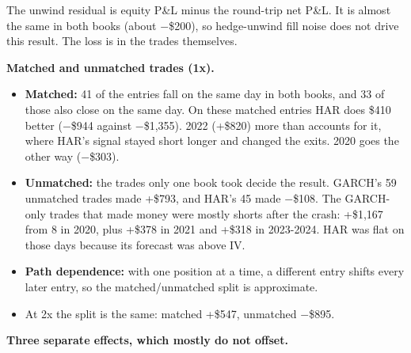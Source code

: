 \documentclass{article}
\begin{document}
The unwind residual is equity P\&L minus the round-trip net P\&L. It is almost the same in both books (about \ensuremath{-}\$200), so hedge-unwind fill noise does not drive this result. The loss is in the trades themselves.

\textbf{Matched and unmatched trades (1x).}

\begin{itemize}

\item \textbf{Matched:} 41 of the entries fall on the same day in both books, and 33 of those also close on the same day. On these matched entries HAR does \$410 better (\ensuremath{-}\$944 against \ensuremath{-}\$1,355). 2022 (+\$820) more than accounts for it, where HAR's signal stayed short longer and changed the exits. 2020 goes the other way (\ensuremath{-}\$303).

\item \textbf{Unmatched:} the trades only one book took decide the result. GARCH's 59 unmatched trades made +\$793, and HAR's 45 made \ensuremath{-}\$108. The GARCH-only trades that made money were mostly shorts after the crash: +\$1,167 from 8 in 2020, plus +\$378 in 2021 and +\$318 in 2023-2024. HAR was flat on those days because its forecast was above IV.

\item \textbf{Path dependence:} with one position at a time, a different entry shifts every later entry, so the matched/\allowbreak{}unmatched split is approximate.

\item At 2x the split is the same: matched +\$547, unmatched \ensuremath{-}\$895.

\end{itemize}

\textbf{Three separate effects, which mostly do not offset.}
\end{document}
